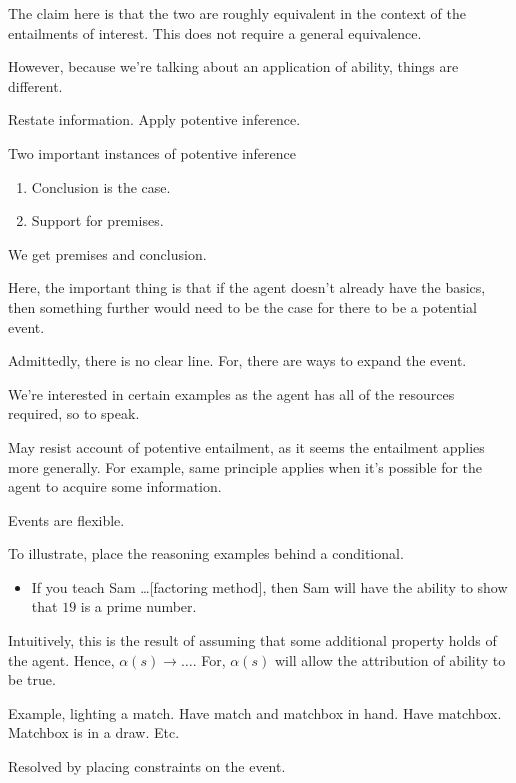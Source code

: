 \begin{note}
  The claim here is that the two are roughly equivalent in the context of the entailments of interest.
  This does not require a general equivalence.

  However, because we're talking about an application of ability, things are different.
\end{note}

\begin{note}
  Restate information.
  Apply potentive inference.

  Two important instances of potentive inference
  \begin{enumerate}
  \item Conclusion is the case.
  \item Support for premises.
  \end{enumerate}
\end{note}

\begin{note}
  We get premises and conclusion.

  Here, the important thing is that if the agent doesn't already have the basics, then something further would need to be the case for there to be a potential event.

  Admittedly, there is no clear line.
  For, there are ways to expand the event.

  We're interested in certain examples as the agent has all of the resources required, so to speak.

  May resist account of potentive entailment, as it seems the entailment applies more generally.
  For example, same principle applies when it's possible for the agent to acquire some information.

  Events are flexible.

  To illustrate, place the reasoning examples behind a conditional.
  \begin{itemize}
  \item If you teach Sam \dots [factoring method], then Sam will have the ability to show that \(19\) is a prime number.
  \end{itemize}
  Intuitively, this is the result of assuming that some additional property holds of the agent.
  Hence, \(\alpha(s) \rightarrow \dots\).
  For, \(\alpha(s)\) will allow the attribution of ability to be true.

  Example, lighting a match.
  Have match and matchbox in hand.
  Have matchbox.
  Matchbox is in a draw.
  Etc.

  Resolved by placing constraints on the event.
\end{note}

